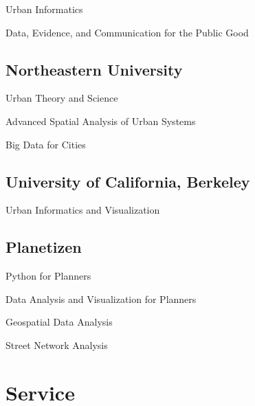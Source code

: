 \documentclass[12pt,letterpaper]{report}
\newcommand{\listitemspace}{0.15em}
\renewenvironment{itemize}
{\begin{list}{}{\setlength{\leftmargin}{0em}
            \setlength{\parskip}{0em}
            \setlength{\itemsep}{\listitemspace}
            \setlength{\parsep}{\listitemspace}}}
    {\end{list}}
\begin{document}
    \begin{itemize}
    	
    	\item Urban Informatics
    	\item Data, Evidence, and Communication for the Public Good
    
	\end{itemize}
    	
    \subsection*{Northeastern University}

    \begin{itemize}

        \item Urban Theory and Science
        \item Advanced Spatial Analysis of Urban Systems
        \item Big Data for Cities

    \end{itemize}

    \subsection*{University of California, Berkeley}

    \begin{itemize}

        \item Urban Informatics and Visualization

    \end{itemize}

    \subsection*{Planetizen}

    \begin{itemize}

        \item Python for Planners
        \item Data Analysis and Visualization for Planners
        \item Geospatial Data Analysis
        \item Street Network Analysis

    \end{itemize}


    \section*{Service}
\end{document}
